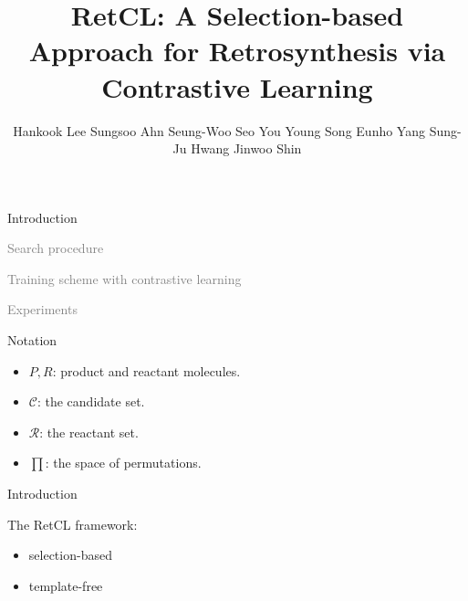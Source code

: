 \documentclass{beamer}		%
\title[RetCL]{RetCL: A Selection-based Approach for Retrosynthesis via Contrastive Learning}	%
\author[Shen Yuan]{Hankook Lee \quad Sungsoo Ahn \quad Seung-Woo Seo \quad You Young Song \quad Eunho Yang \quad Sung-Ju Hwang \quad Jinwoo Shin} %
\begin{document}


\newcommand{\light}[1]{\textcolor{gray}{#1}}

\begin{frame}	

\titlepage	%
	
\end{frame}	



\begin{frame}[noframenumbering]
\begin{itemize}
    \begin{LARGE}
    \item Introduction
    \item \light{Search procedure}
    \item \light{Training scheme with contrastive learning}
    \item \light{Experiments}
    \end{LARGE}
\end{itemize}
\end{frame}



\begin{frame}{Notation}

\begin{itemize}
    \item $P,R$: product and reactant molecules.
    \item $\mathcal{C}$: the candidate set.
    \item $\mathcal{R}$: the reactant set.
    \item $\prod$: the space of permutations.
\end{itemize}

\end{frame}



\begin{frame}{Introduction}

The RetCL framework:

\begin{itemize}
    \item selection-based
    \item template-free
\end{itemize}

\end{frame}
\end{document}

